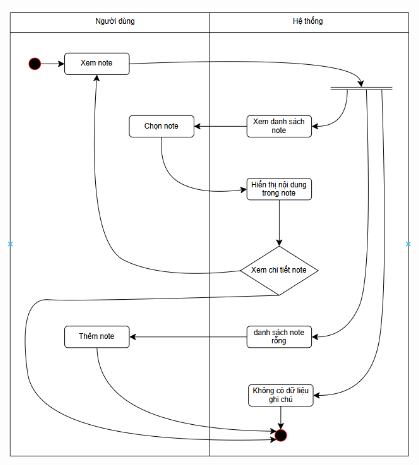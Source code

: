 \documentclass[a4paper,12pt]{article}
\begin{document}
\includegraphics[width=0.8\textwidth]{UCxemnote.png}

\clearpage
\end{document}
